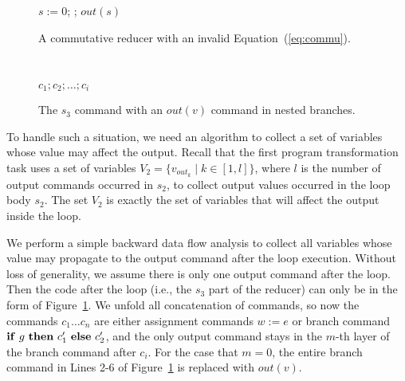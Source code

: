 \documentclass{llncs}
\newcommand{\cur}{cur()}
\newcommand{\ite}[3]{
	 \ifmmode
	 \mathbf{if}\ #1 \ \mathbf{then}\ #2\  \mathbf{else}\ #3
	 \else
	 \textbf{if}\ #1 \ \textbf{then}\ #2\  \textbf{else}\ #3
	 \fi}
\begin{document}
\begin{figure}[hbt]
	\begin{minipage}{0.4\textwidth}
		\begin{algorithm}[H]
			$s:= 0$; \;
			\Loop{}{
				$t:=\cur$;
				$s:= s + t$\;
			};
			$out(s)$\;\;\;
		\end{algorithm}
		\caption{A commutative reducer with an invalid Equation~(\ref{eq:commu}).}
		\label{fig:reducer_opt}
	\end{minipage}
	\ \ \ \ \ \ \ \ 
	\begin{minipage}{0.5\textwidth}
		\LinesNumbered
		\centering
		\begin{minipage}{0.75\textwidth}
		\begin{algorithm}[H]
			$c_1;c_2;\ldots;c_i$\;
			\lElse{ $\ldots$}
		\end{algorithm}
	\end{minipage}
		\caption{The $s_3$ command with an $out(v)$ command in nested branches.}
		\label{fig:nested_out}
	\end{minipage}
\end{figure}


To handle such a situation, we need an algorithm to collect a set of variables whose value may affect the output. 
Recall that the first program transformation task uses a set of variables $V_2=\{v_{out_k} \mid k \in [1,l]\}$, where $l$ is the number of output commands occurred in $s_2$, to collect output values occurred in the loop body $s_2$.
The set $V_2$ is exactly the set of variables that will affect the output inside the loop.

We perform a simple backward data flow analysis to collect all variables whose value may propagate to the output command after the loop execution. Without loss of generality, we assume there is only one output command after the loop. Then the code after the loop (i.e., the $s_3$ part of the reducer) can only be in the form of Figure~\ref{fig:nested_out}.
We unfold all concatenation of commands, so now the commands $c_1\ldots c_n$ are either assignment commands $w:=e$ or branch command $\ite{g}{c'_1}{c'_2}$, and the only output command stays in the $m$-th layer of the branch command after $c_i$. For the case that $m=0$, the entire branch command in Lines 2-6 of Figure~\ref{fig:nested_out} is replaced with $out(v)$.
\end{document}
